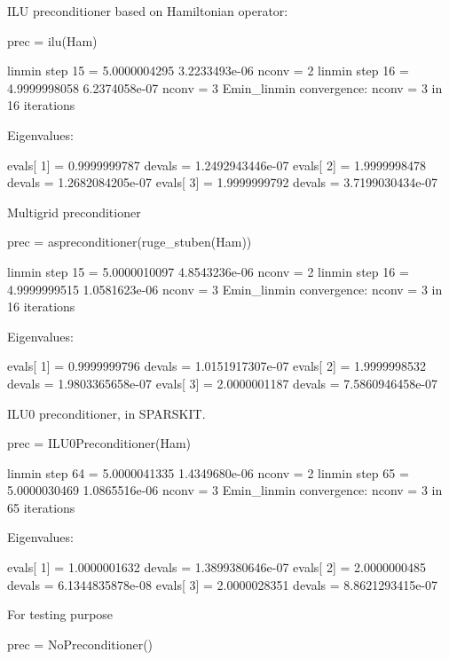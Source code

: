 ILU preconditioner based on Hamiltonian operator:
\begin{juliacode}
prec = ilu(Ham)
\end{juliacode}

\begin{textcode}
linmin step       15 =       5.0000004295   3.2233493e-06  nconv =     2
linmin step       16 =       4.9999998058   6.2374058e-07  nconv =     3
Emin_linmin convergence: nconv =     3 in    16 iterations
  
Eigenvalues:
  
evals[  1] =       0.9999999787 devals =   1.2492943446e-07
evals[  2] =       1.9999998478 devals =   1.2682084205e-07
evals[  3] =       1.9999999792 devals =   3.7199030434e-07
\end{textcode}


Multigrid preconditioner
\begin{juliacode}
prec = aspreconditioner(ruge_stuben(Ham))
\end{juliacode}

\begin{textcode}
linmin step       15 =       5.0000010097   4.8543236e-06  nconv =     2
linmin step       16 =       4.9999999515   1.0581623e-06  nconv =     3
Emin_linmin convergence: nconv =     3 in    16 iterations

Eigenvalues:

evals[  1] =       0.9999999796 devals =   1.0151917307e-07
evals[  2] =       1.9999998532 devals =   1.9803365658e-07
evals[  3] =       2.0000001187 devals =   7.5860946458e-07
\end{textcode}


ILU0 preconditioner, in SPARSKIT.
\begin{juliacode}
prec = ILU0Preconditioner(Ham)
\end{juliacode}

\begin{textcode}
linmin step       64 =       5.0000041335   1.4349680e-06  nconv =     2
linmin step       65 =       5.0000030469   1.0865516e-06  nconv =     3
Emin_linmin convergence: nconv =     3 in    65 iterations

Eigenvalues:

evals[  1] =       1.0000001632 devals =   1.3899380646e-07
evals[  2] =       2.0000000485 devals =   6.1344835878e-08
evals[  3] =       2.0000028351 devals =   8.8621293415e-07
\end{textcode}


For testing purpose
\begin{juliacode}
prec = NoPreconditioner()
\end{juliacode}

